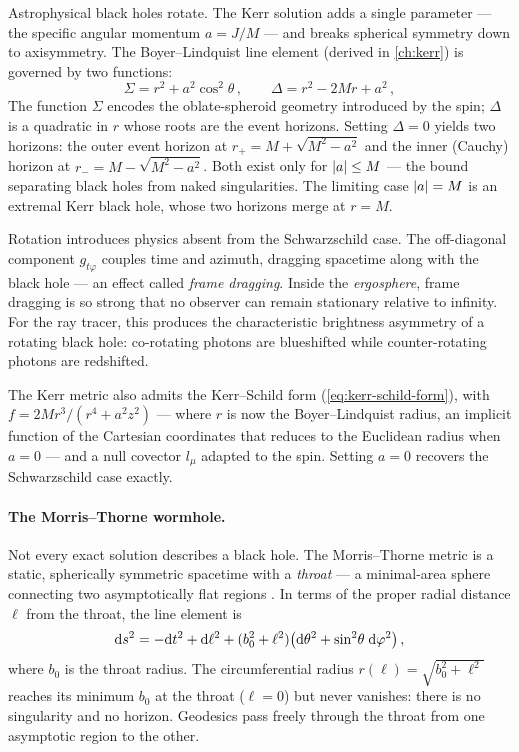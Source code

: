 Astrophysical black holes rotate.  The Kerr solution adds a single
parameter --- the specific angular momentum $a = J/M$ --- and breaks
spherical symmetry down to axisymmetry.  The Boyer--Lindquist line
element (derived in \cref{ch:kerr}) is governed by two functions:
%
\begin{equation}
  \Sigma = r^2 + a^2 \cos^2\!\theta \,, \qquad
  \Delta = r^2 - 2Mr + a^2 \,,
  \label{eq:kerr-sigma-delta}
\end{equation}
%
The function $\Sigma$ encodes the oblate-spheroid geometry
introduced by the spin; $\Delta$ is a quadratic in $r$ whose roots
are the event horizons.  Setting $\Delta = 0$ yields two horizons:
the outer event horizon at $r_+ = M + \sqrt{M^2 - a^2}$ and the
inner (Cauchy) horizon at $r_- = M - \sqrt{M^2 - a^2}$.  Both exist
only for $\left\lvert a \right\rvert \leq M$ --- the bound separating black holes from
naked singularities.  The limiting case $\left\lvert a \right\rvert = M$ is an extremal
Kerr black hole, whose two horizons merge at $r = M$.

Rotation introduces physics absent from the Schwarzschild case.
The off-diagonal component $g_{t\varphi}$ couples time and azimuth,
dragging spacetime along with the black hole --- an effect called
\emph{frame dragging}.  Inside the \emph{ergosphere}, frame dragging
is so strong that no observer can remain stationary relative to
infinity.  For the ray tracer, this produces the characteristic
brightness asymmetry of a rotating black hole: co-rotating photons
are blueshifted while counter-rotating photons are redshifted.

The Kerr metric also admits the Kerr--Schild form
(\cref{eq:kerr-schild-form}), with
$f = 2Mr^3/(r^4 + a^2 z^2)$ --- where $r$ is now the Boyer--Lindquist
radius, an implicit function of the Cartesian coordinates that reduces
to the Euclidean radius when $a = 0$ --- and a null covector $l_\mu$
adapted to the spin.  Setting $a = 0$ recovers the Schwarzschild case
exactly.

\paragraph{The Morris--Thorne wormhole.}

Not every exact solution describes a black hole.  The Morris--Thorne
metric is a static, spherically symmetric spacetime with a
\emph{throat} --- a minimal-area sphere connecting two asymptotically
flat regions \cite{MorrisThorne1988}.  In terms of the proper radial
distance $\ell$ from the throat, the line element is
%
\begin{equation}
  \mathrm{d} s^2 = -\mathrm{d} t^2 + \mathrm{d}\ell^2
           + (b_0^2 + \ell^2)\!\left(\mathrm{d}\theta^2
             + \sin^2\!\theta\;\mathrm{d}\varphi^2\right) ,
  \label{eq:morris-thorne-metric}
\end{equation}
%
where $b_0$ is the throat radius.  The circumferential radius
$r(\ell) = \sqrt{b_0^2 + \ell^2}$ reaches its minimum $b_0$ at the
throat ($\ell = 0$) but never vanishes: there is no singularity and
no horizon.  Geodesics pass freely through the throat from one
asymptotic region to the other.

